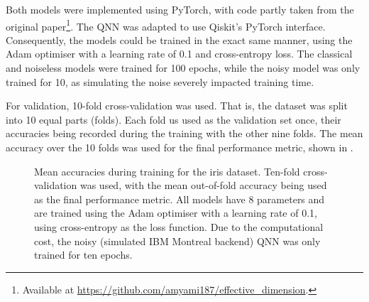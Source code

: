 Both models were implemented using PyTorch, with code partly taken from the original paper\footnote{Available at \url{https://github.com/amyami187/effective_dimension}.}.
The QNN was adapted to use Qiskit's PyTorch interface.
Consequently, the models could be trained in the exact same manner, using the Adam optimiser with a learning rate of 0.1 and cross-entropy loss.
The classical and noiseless models were trained for 100 epochs, while the noisy model was only trained for 10, as simulating the noise severely impacted training time.

For validation, 10-fold cross-validation was used.
That is, the dataset was split into 10 equal parts (folds).
Each fold us used as the validation set once, their accuracies being recorded during the training with the other nine folds.
The mean accuracy over the 10 folds was used for the final performance metric, shown in .

\begin{figure}
    \centering
    \caption{
        Mean accuracies during training for the iris dataset.
        Ten-fold cross-validation was used, with the mean out-of-fold accuracy being used as the final performance metric.
        All models have 8 parameters and are trained using the Adam optimiser with a learning rate of 0.1, using cross-entropy as the loss function.
        Due to the computational cost, the noisy (simulated IBM Montreal backend) QNN was only trained for ten epochs.
    }
    \label{fig:iris_training}
\end{figure}


